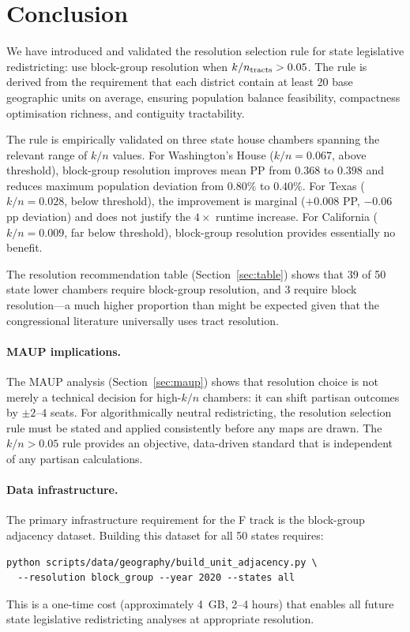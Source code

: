 \section{Conclusion}
\label{sec:conclusion}

We have introduced and validated the resolution selection rule for state
legislative redistricting: use block-group resolution when
$k/n_{\rm tracts} > 0.05$. The rule is derived from the requirement that
each district contain at least 20 base geographic units on average, ensuring
population balance feasibility, compactness optimisation richness, and contiguity
tractability.

The rule is empirically validated on three state house chambers spanning the
relevant range of $k/n$ values. For Washington's House ($k/n = 0.067$, above
threshold), block-group resolution improves mean PP from $0.368$ to $0.398$
and reduces maximum population deviation from $0.80\%$ to $0.40\%$.
For Texas ($k/n = 0.028$, below threshold), the improvement is marginal
($+0.008$ PP, $-0.06$\,pp deviation) and does not justify the $4\times$
runtime increase. For California ($k/n = 0.009$, far below threshold),
block-group resolution provides essentially no benefit.

The resolution recommendation table (Section~\ref{sec:table}) shows that
39 of 50 state lower chambers require block-group resolution, and 3 require
block resolution---a much higher proportion than might be expected given that
the congressional literature universally uses tract resolution.

\paragraph{MAUP implications.}
The MAUP analysis (Section~\ref{sec:maup}) shows that resolution choice
is not merely a technical decision for high-$k/n$ chambers: it can shift
partisan outcomes by $\pm 2$--$4$ seats. For algorithmically neutral
redistricting, the resolution selection rule must be stated and applied
consistently before any maps are drawn. The $k/n > 0.05$ rule provides
an objective, data-driven standard that is independent of any partisan
calculations.

\paragraph{Data infrastructure.}
The primary infrastructure requirement for the F track is the block-group
adjacency dataset. Building this dataset for all 50 states requires:
\begin{verbatim}
python scripts/data/geography/build_unit_adjacency.py \
  --resolution block_group --year 2020 --states all
\end{verbatim}
This is a one-time cost (approximately 4~GB, 2--4 hours) that enables all
future state legislative redistricting analyses at appropriate resolution.

